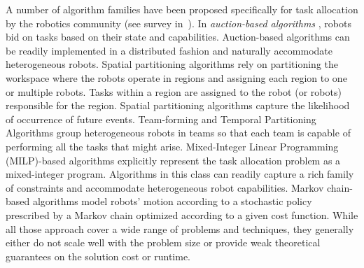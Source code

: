 \documentclass[conference]{IEEEtran}
\newcommand{\frline}[2]{{\color{blue}#1}{\em \color{blue}[FR]: #2}}
\newcommand{\frline}[2]{#1}
\begin{document}
A number of algorithm families have been proposed specifically for 
task allocation by the robotics community (see survey in~\cite{RossiBandyopadhyayEtAl2018}). In \emph{auction-based algorithms} \cite{Mataric04,Ayanian17}, robots bid on tasks based on their state and capabilities. Auction-based algorithms can be readily implemented in a distributed fashion and naturally accommodate heterogeneous robots. Spatial partitioning algorithms \cite{PavoneFrazzoliEtAl2011} rely on partitioning the workspace where the robots operate in regions and assigning each region to one or multiple robots. Tasks within a region are assigned to the robot (or robots) responsible for the region. Spatial partitioning algorithms capture the likelihood of occurrence of future events.%
Team-forming and Temporal Partitioning Algorithms \cite{Smith09} group heterogeneous robots in teams so that each team is capable of performing all the tasks that might arise. %
Mixed-Integer Linear Programming (MILP)-based algorithms \cite{Bellingham03} explicitly represent the task allocation problem as a mixed-integer program. Algorithms in this class can readily capture a rich family of constraints and accommodate heterogeneous robot capabilities.%
Markov chain-based algorithms \cite{Bandyopadhyay17} model robots' motion according to a stochastic policy prescribed by a Markov chain optimized according to a given cost function. %
While all those approach cover a wide range of problems and techniques, they generally either do not scale well with the problem size or provide weak theoretical guarantees on the solution cost or runtime.
\end{document}
